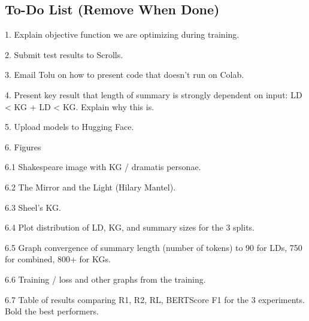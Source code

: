 \subsection*{To-Do List (Remove When Done)}
1. Explain objective function we are optimizing during training.

2. Submit test results to Scrolls.

3. Email Tolu on how to present code that doesn't run on Colab.

4. Present key result that length of summary is strongly dependent on input: LD < KG + LD < KG. Explain why this is.

5. Upload models to Hugging Face.

6. Figures

6.1 Shakespeare image with KG / dramatis personae.

6.2 The Mirror and the Light (Hilary Mantel).

6.3 Sheel's KG.

6.4 Plot distribution of LD, KG, and summary sizes for the 3 splits.

6.5 Graph convergence of summary length (number of tokens) to 90 for LDs, 750 for combined, 800+ for KGs.

6.6 Training / loss and other graphs from the training.

6.7 Table of results comparing R1, R2, RL, BERTScore F1 for the 3 experiments. Bold the best performers.